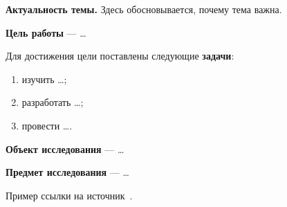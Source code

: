 
\textbf{Актуальность темы.} Здесь обосновывается, почему тема важна.

\textbf{Цель работы} --- \ldots

Для достижения цели поставлены следующие \textbf{задачи}:
\begin{enumerate}
  \item изучить \ldots;
  \item разработать \ldots;
  \item провести \ldots.
\end{enumerate}

\textbf{Объект исследования} --- \ldots

\textbf{Предмет исследования} --- \ldots

Пример ссылки на источник~\cite{knuth1984}.
